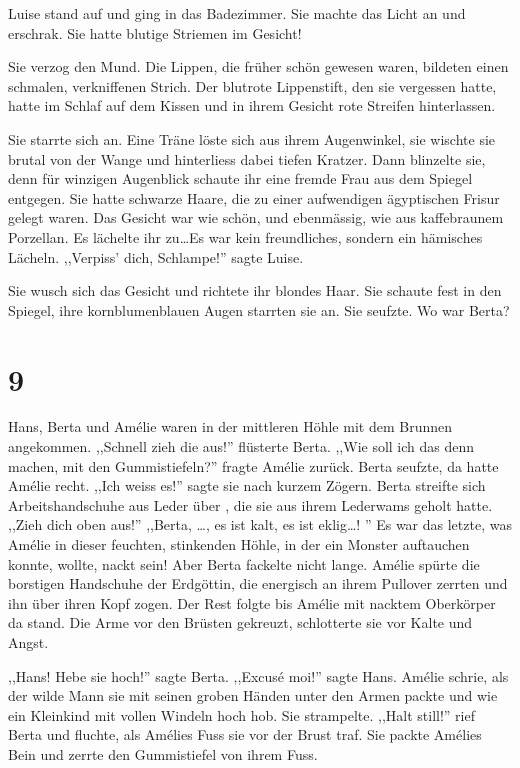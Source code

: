 \documentclass[11pt,titlepage,a5paper]{book}
\newcommand{\am}{Amélie }
\begin{document}
Luise stand auf und ging in das Badezimmer. Sie machte das Licht an und erschrak. Sie hatte blutige Striemen im Gesicht! 

Sie verzog den Mund. Die Lippen, die früher schön gewesen waren, bildeten einen schmalen, verkniffenen Strich. Der blutrote Lippenstift, den sie vergessen hatte, hatte im Schlaf auf dem Kissen und in ihrem Gesicht rote Streifen hinterlassen.

Sie starrte sich an. Eine Träne löste sich aus ihrem Augenwinkel, sie wischte sie brutal von der Wange und hinterliess dabei tiefen Kratzer. Dann blinzelte sie, denn für winzigen Augenblick schaute ihr eine fremde Frau aus dem Spiegel entgegen. Sie hatte schwarze Haare, die zu einer aufwendigen ägyptischen Frisur gelegt waren. Das Gesicht war wie schön, und ebenmässig, wie aus kaffebraunem Porzellan. Es lächelte ihr zu\dots Es war kein freundliches, sondern ein hämisches Lächeln. ,,Verpiss' dich, Schlampe!'' sagte Luise. 

Sie wusch sich das Gesicht und richtete ihr blondes Haar. Sie schaute fest in den Spiegel, ihre kornblumenblauen Augen starrten sie an. Sie seufzte. Wo war Berta? 

\section*{9}

Hans, Berta und \am waren in der mittleren Höhle mit dem Brunnen angekommen. ,,Schnell zieh die aus!'' flüsterte Berta. ,,Wie soll ich das denn machen, mit den Gummistiefeln?'' fragte \am zurück. Berta seufzte, da hatte \am recht. ,,Ich weiss es!'' sagte sie nach kurzem Zögern. Berta streifte sich Arbeitshandschuhe aus Leder über , die sie aus ihrem Lederwams geholt hatte. ,,Zieh dich oben aus!'' ,,Berta, \dots, es ist kalt, es ist eklig\dots! '' Es war das letzte, was \am in dieser feuchten, stinkenden Höhle, in der ein Monster auftauchen konnte, wollte, nackt sein! Aber Berta fackelte nicht lange. \am spürte die borstigen Handschuhe der Erdgöttin, die energisch an ihrem Pullover zerrten und ihn über ihren Kopf zogen. Der Rest folgte bis \am mit nacktem Oberkörper da stand. Die Arme vor den Brüsten gekreuzt, schlotterte sie vor Kalte und Angst.

,,Hans! Hebe sie hoch!'' sagte Berta. ,,Excusé moi!'' sagte Hans. Amélie schrie, als der wilde Mann sie mit seinen groben Händen unter den Armen packte und wie ein Kleinkind mit vollen Windeln  hoch hob. Sie strampelte. ,,Halt still!'' rief Berta und fluchte, als Amélies Fuss sie vor der Brust traf. Sie packte Amélies Bein und zerrte den Gummistiefel von ihrem Fuss.
\end{document}
